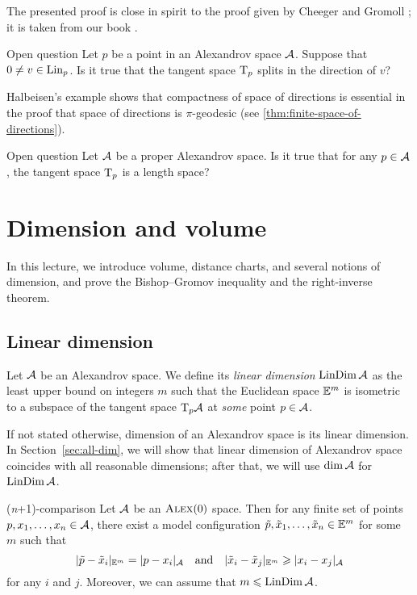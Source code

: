 The presented proof is close in spirit to the proof given by Cheeger and Gromoll \cite{cheeger-gromoll-split};
it is taken from our book \cite{alexander-kapovitch-petrunin2024}.

\begin{thm}{Open question}
Let $p$ be a point in an Alexandrov space $\mathcal{A}$.
Suppose that $0\ne v\in \mathop{\rm Lin}\nolimits_p$.
Is it true that the tangent space $\mathrm{T}_p$ splits in the direction of $v$?
\end{thm}

Halbeisen's example \cite{alexander-kapovitch-petrunin2024,halbeisen} shows that compactness of space of directions is essential in the proof that space of directions is $\pi$-geodesic (see \ref{thm:finite-space-of-directions}).

\begin{thm}{Open question}\label{open:Halb-proper}
Let $\mathcal{A}$ be a proper Alexandrov space.
Is it true that for any $p\in \mathcal{A}$, the tangent space $\mathrm{T}_p$ is a length space?
\end{thm}


\chapter{Dimension and volume}\label{chap:dim}

In this lecture, we introduce volume, distance charts, and several notions of dimension, and prove the Bishop--Gromov inequality and the right-inverse theorem.

\section{Linear dimension}

Let $\mathcal{A}$ be an Alexandrov space.
We define its \emph{linear dimension} $\mathop{\rm LinDim}\nolimits \mathcal{A}$ as the least upper bound on integers $m$ such that
the Euclidean space $\mathbb{E}^m$ is isometric to a subspace of the tangent space $\mathrm{T}_p\mathcal{A}$ at \textit{some} point $p\in \mathcal{A}$.

If not stated otherwise, dimension of an Alexandrov space is its linear dimension.
In Section~\ref{sec:all-dim}, we will show that linear dimension of Alexandrov space coincides with all reasonable dimensions;
after that, we will use $\operatorname{\rm dim}\nolimits\mathcal{A}$ for $\mathop{\rm LinDim}\nolimits\mathcal{A}$.

\begin{thm}{(\textit{n}+1)-comparison}\label{thm:n+1}
Let $\mathcal{A}$ be an $\textsc{Alex}(0)$ space.
Then for any finite set of points $p,x_1,\dots,x_n\in \mathcal{A}$, there exist a model configuration
$\tilde p,\tilde x_1,\dots,\tilde x_n\in \mathbb{E}^m$ for some $m$ such that
\[|\tilde p-\tilde x_i|_{\mathbb{E}^m}=| p- x_i|_{\mathcal{A}}
\quad\text{and}\quad
|\tilde x_i-\tilde x_j|_{\mathbb{E}^m}\geqslant |x_i- x_j|_{\mathcal{A}}\]
for any $i$ and $j$.
Moreover, we can assume that $m\leqslant \mathop{\rm LinDim}\nolimits\mathcal{A}$. 
\end{thm}

